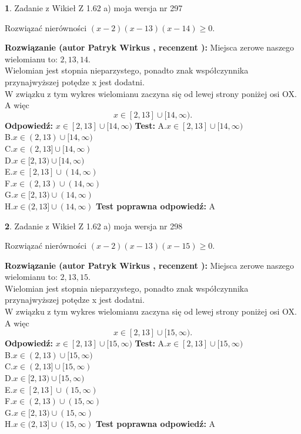 \documentclass[12pt, a4paper]{article}
\theoremstyle{definition} %
\newtheorem{zad}{}
\newcommand{\zadStart}[1]{\begin{zad}#1\newline}
\newcommand{\zadStop}{\end{zad}}
\newcommand{\rozwStart}[2]{\noindent \textbf{Rozwiązanie (autor #1 , recenzent #2): }\newline}
\newcommand{\rozwStop}{\newline}
\newcommand{\odpStart}{\noindent \textbf{Odpowiedź:}\newline}
\newcommand{\odpStop}{\newline}
\newcommand{\testStart}{\noindent \textbf{Test:}\newline}
\newcommand{\testStop}{\newline}
\newcommand{\kluczStart}{\noindent \textbf{Test poprawna odpowiedź:}\newline}
\newcommand{\kluczStop}{\newline}
\begin{document}
\zadStart{Zadanie z Wikieł Z 1.62 a) moja wersja nr 297}

Rozwiązać nierówności $(x-2)(x-13)(x-14)\ge0$.
\zadStop
\rozwStart{Patryk Wirkus}{}
Miejsca zerowe naszego wielomianu to: $2, 13, 14$.\\
Wielomian jest stopnia nieparzystego, ponadto znak współczynnika przy\linebreak najwyższej potędze x jest dodatni.\\ W związku z tym wykres wielomianu zaczyna się od lewej strony poniżej osi OX. A więc $$x \in [2,13] \cup [14,\infty).$$
\rozwStop
\odpStart
$x \in [2,13] \cup [14,\infty)$
\odpStop
\testStart
A.$x \in [2,13] \cup [14,\infty)$\\
B.$x \in (2,13) \cup [14,\infty)$\\
C.$x \in (2,13] \cup [14,\infty)$\\
D.$x \in [2,13) \cup [14,\infty)$\\
E.$x \in [2,13] \cup (14,\infty)$\\
F.$x \in (2,13) \cup (14,\infty)$\\
G.$x \in [2,13) \cup (14,\infty)$\\
H.$x \in (2,13] \cup (14,\infty)$
\testStop
\kluczStart
A
\kluczStop



\zadStart{Zadanie z Wikieł Z 1.62 a) moja wersja nr 298}

Rozwiązać nierówności $(x-2)(x-13)(x-15)\ge0$.
\zadStop
\rozwStart{Patryk Wirkus}{}
Miejsca zerowe naszego wielomianu to: $2, 13, 15$.\\
Wielomian jest stopnia nieparzystego, ponadto znak współczynnika przy\linebreak najwyższej potędze x jest dodatni.\\ W związku z tym wykres wielomianu zaczyna się od lewej strony poniżej osi OX. A więc $$x \in [2,13] \cup [15,\infty).$$
\rozwStop
\odpStart
$x \in [2,13] \cup [15,\infty)$
\odpStop
\testStart
A.$x \in [2,13] \cup [15,\infty)$\\
B.$x \in (2,13) \cup [15,\infty)$\\
C.$x \in (2,13] \cup [15,\infty)$\\
D.$x \in [2,13) \cup [15,\infty)$\\
E.$x \in [2,13] \cup (15,\infty)$\\
F.$x \in (2,13) \cup (15,\infty)$\\
G.$x \in [2,13) \cup (15,\infty)$\\
H.$x \in (2,13] \cup (15,\infty)$
\testStop
\kluczStart
A
\kluczStop
\end{document}
